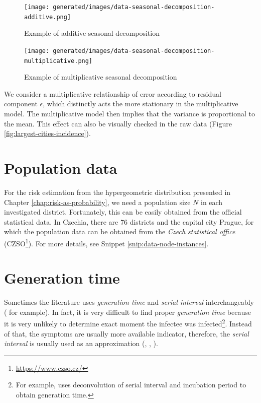 \documentclass[
  digital, %
  oneside, %
  lof,     %
  lot,     %
]{fithesis4}
\begin{document}
\begin{figure}[H]
  \begin{center}
    \texttt{[image: generated/images/data-seasonal-decomposition-additive.png]}
  \end{center}
  \caption{Example of additive seasonal decomposition}
  \label{fig:seasonal-decomposition-additive}
\end{figure}

\begin{figure}[H]
  \begin{center}
    \texttt{[image: generated/images/data-seasonal-decomposition-multiplicative.png]}
  \end{center}
  \caption{Example of multiplicative seasonal decomposition}
  \label{fig:seasonal-decomposition-multiplicative}
\end{figure}

We consider a multiplicative relationship of error according to residual component $\epsilon$, which distinctly acts the more stationary in the multiplicative model.
The multiplicative model then implies that the variance is proportional to the mean.
This effect can also be visually checked in the raw data (Figure \ref{fig:largest-cities-incidence}).


\section{Population data}

For the risk estimation from the hypergeometric distribution presented in Chapter \ref{chap:risk-as-probability}, we need a population size $N$ in each investigated district.
Fortunately, this can be easily obtained from the official statistical data.
In Czechia, there are 76 districts and the capital city Prague, for which the population data can be obtained from the \textit{Czech statistical office} (CZSO\footnote{\url{https://www.czso.cz/}}).
For more details, see Snippet \ref{snip:data-node-instances}.


\section{Generation time}

Sometimes the literature uses \textit{generation time} and \textit{serial interval} interchangeably (\cite{wallinga2004} for example).
In fact, it is very difficult to find proper \textit{generation time} because it is very unlikely to determine exact moment the infectee was infected\footnote{For example, \cite{knight2020} uses deconvolution of serial interval and incubation period to obtain generation time.}.
Instead of that, the symptoms are usually more available indicator, therefore, the \textit{serial interval} is usually used as an approximation (\cite{griffin2010}, \cite{najafi2020}, \cite{cori2013}).
\end{document}
